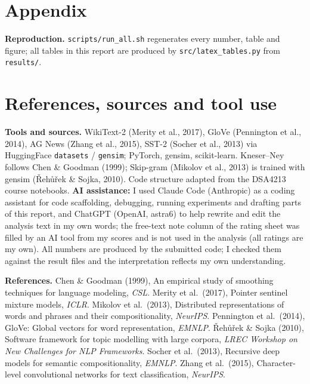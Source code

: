 \documentclass[10pt]{article}
\begin{document}
\clearpage
\appendix
\section*{Appendix}
\begin{table}[h]
\centering\footnotesize

\caption{Cosine nearest neighbours in four 300-d input-embedding tables (LSTM columns: tables after LM training
with default and small initialisation).}
\label{tab:nn}
\end{table}

\begin{table}[h]
\centering\footnotesize

\caption{AG News test accuracy by the share of \texttt{<unk>} tokens in an article (mean pooling).}
\label{tab:oov}
\end{table}

\textbf{Reproduction.} \texttt{scripts/run\_all.sh} regenerates every number, table and figure; all tables in this
report are produced by \texttt{src/latex\_tables.py} from \texttt{results/}.

\section*{References, sources and tool use}
\textbf{Tools and sources.} WikiText-2 (Merity et al., 2017), GloVe (Pennington et al., 2014), AG News (Zhang et
al., 2015), SST-2 (Socher et al., 2013) via HuggingFace \texttt{datasets} / \texttt{gensim}; PyTorch, gensim,
scikit-learn. Kneser--Ney follows Chen \& Goodman (1999); Skip-gram (Mikolov et al., 2013) is trained with gensim (\v{R}eh\r{u}\v{r}ek \& Sojka, 2010). Code structure adapted from the DSA4213 course
notebooks. \textbf{AI assistance:} I used Claude Code (Anthropic) as a coding assistant for code
scaffolding, debugging, running experiments and drafting parts of this report, and ChatGPT (OpenAI, astra6) to help
rewrite and edit the analysis text in my own words; the free-text note column of the rating sheet was filled by an
AI tool from my scores and is not used in the analysis (all ratings are my own). All numbers are produced
by the submitted code; I checked them against the result files and the interpretation reflects my own understanding.

\textbf{References.}
Chen \& Goodman (1999), An empirical study of smoothing techniques for language modeling, \emph{CSL}.
Merity et al.\ (2017), Pointer sentinel mixture models, \emph{ICLR}.
Mikolov et al.\ (2013), Distributed representations of words and phrases and their compositionality, \emph{NeurIPS}.
Pennington et al.\ (2014), GloVe: Global vectors for word representation, \emph{EMNLP}.
\v{R}eh\r{u}\v{r}ek \& Sojka (2010), Software framework for topic modelling with large corpora, \emph{LREC Workshop on New Challenges for NLP Frameworks}.
Socher et al.\ (2013), Recursive deep models for semantic compositionality, \emph{EMNLP}.
Zhang et al.\ (2015), Character-level convolutional networks for text classification, \emph{NeurIPS}.
\end{document}
